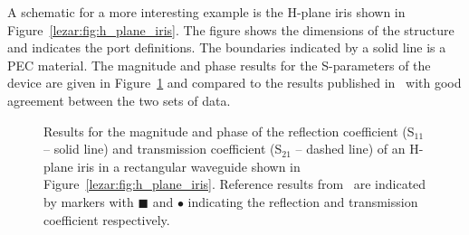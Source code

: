A schematic for a more interesting example is the H-plane iris shown
in Figure~\ref{lezar:fig:h_plane_iris}. The figure shows the dimensions of
the structure and indicates the port definitions. The boundaries
indicated by a solid line is a PEC material. The magnitude and phase
results for the S-parameters of the device are given in
Figure~\ref{lezar:fig:h_plane_iris_S_parameters} and compared to the results
published in~\cite{PelosiCoccioliSelleri1998} with good agreement between the two
sets of data.
\begin{figure}[h]
\centering
 \caption{Results for the magnitude and phase of the reflection
   coefficient (S$_{11}$ -- solid line) and transmission coefficient
   (S$_{21}$ -- dashed line) of an H-plane iris in a rectangular
   waveguide shown in Figure~\ref{lezar:fig:h_plane_iris}. Reference
   results from~\cite{PelosiCoccioliSelleri1998} are indicated by markers with
   $\blacksquare$ and $\bullet$ indicating the reflection and
   transmission coefficient respectively.}
 \label{lezar:fig:h_plane_iris_S_parameters}
\end{figure}
